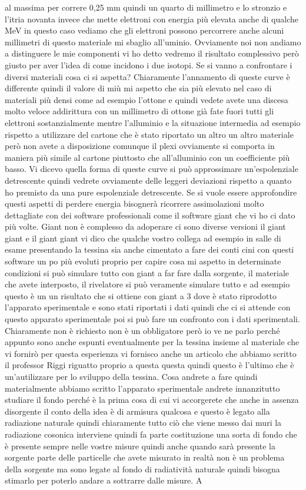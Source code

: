 al massima per correre 0,25 mm quindi un quarto di millimetro e lo stronzio e l'itria novanta invece che mette elettroni con energia più elevata anche di qualche MeV in questo caso vediamo che gli elettroni possono percorrere anche alcuni millimetri di questo materiale mi sbaglio all'uminio. Ovviamente noi non andiamo a distinguere le mie componenti vi ho detto vedremo il risultato complessivo però giusto per aver l'idea di come incidono i due isotopi. Se si vanno a confrontare i diversi materiali cosa ci si aspetta? Chiaramente l'annamento di queste curve è differente quindi il valore di miù mi aspetto che sia più elevato nel caso di materiali più densi come ad esempio l'ottone e quindi vedete avete una discesa molto veloce addirittura con un millimetro di ottone già fate fuori tutti gli elettroni sostanzialmente mentre l'alluminio e la situazione intermedia ad esempio rispetto a utilizzare del cartone che è stato riportato un altro un altro materiale però non avete a disposizione comunque il plexi ovviamente si comporta in maniera più simile al cartone piuttosto che all'alluminio con un coefficiente più basso. Vi dicevo quella forma di queste curve si può approssimare un'espolenziale detrescente quindi vedrete ovviamente delle leggeri deviazioni rispetto a quanto ho premisto da una pure espolenziale detrescente. Se si vuole essere approfondire questi aspetti di perdere energia bisognerà ricorrere assimolazioni molto dettagliate con dei software professionali come il software giant che vi ho ci dato più volte. Giant non è complesso da adoperare ci sono diverse versioni il giant giant e il giant giant vi dico che qualche vostro collega ad esempio in salle di esame presentando la tessina sia anche cimentato a fare dei conti cini con questi software un po più evoluti proprio per capire cosa mi aspetto in determinate condizioni si può simulare tutto con giant a far fare dalla sorgente, il materiale che avete interposto, il rivelatore si può veramente simulare tutto e ad esempio questo è un un risultato che si ottiene con giant a 3 dove è stato riprodotto l'apparato sperimentale e sono stati riportati i dati quindi che ci si attende con questo apparato sperimentale poi si può fare un confronto con i dati sperimentali. Chiaramente non è richiesto non è un obbligatore però io ve ne parlo perché appunto sono anche espunti eventualmente per la tessina insieme al materiale che vi fornirò per questa esperienza vi fornisco anche un articolo che abbiamo scritto il professor Riggi riguatto proprio a questa questa quindi questo è l'ultimo che è un'autilizzare per lo sviluppo della tessina. Cosa andrete a fare quindi materialmente abbiamo scritto l'apparato sperimentale andrete innanzitutto studiare il fondo perché è la prima cosa di cui vi accorgerete che anche in assenza disorgente il conto della idea è di armisura qualcosa e questo è legato alla radiazione naturale quindi chiaramente tutto ciò che viene messo dai muri la radiazione cosonica interviene quindi fa parte costituzione una sorta di fondo che è presente sempre nelle vostre misure quindi anche quando sarà presente la sorgente parte delle particelle che avete misurato in realtà non è un problema della sorgente ma sono legate al fondo di radiatività naturale quindi bisogna stimarlo per poterlo andare a sottrarre dalle misure. A 